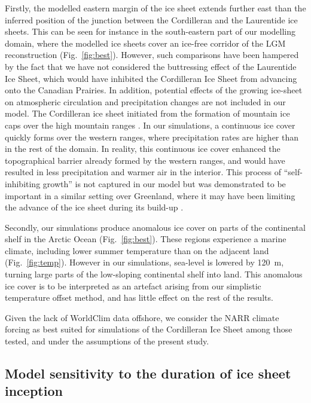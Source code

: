 Firstly, the modelled eastern margin of the ice sheet extends further east than the inferred position of the junction between the Cordilleran and the Laurentide ice sheets. This can be seen for instance in the south-eastern part of our modelling domain, where the modelled ice sheets cover an ice-free corridor of the LGM reconstruction (Fig.~\ref{fig:best}). However, such comparisons have been hampered by the fact that we have not considered the buttressing effect of the Laurentide Ice Sheet, which would have inhibited the Cordilleran Ice Sheet from advancing onto the Canadian Prairies. In addition, potential effects of the growing ice-sheet on atmospheric circulation and precipitation changes are not included in our model. The Cordilleran ice sheet initiated from the formation of mountain ice caps over the high mountain ranges \citep{clague-1989}. In our simulations, a continuous ice cover quickly forms over the western ranges, where precipitation rates are higher than in the rest of the domain. In reality, this continuous ice cover enhanced the topographical barrier already formed by the western ranges, and would have resulted in less precipitation and warmer air in the interior. This process of ``self-inhibiting growth'' is not captured in our model but was demonstrated to be important in a similar setting over Greenland, where it may have been limiting the advance of the ice sheet during its build-up \citep{langen-etal-2012}.

Secondly, our simulations produce anomalous ice cover on parts of the continental shelf in the Arctic Ocean (Fig.~\ref{fig:best}). These regions experience a marine climate, including lower summer temperature than on the adjacent land (Fig.~\ref{fig:temp}). However in our simulations, sea-level is lowered by 120~m, turning large parts of the low-sloping continental shelf into land. This anomalous ice cover is to be interpreted as an artefact arising from our simplistic temperature offset method, and has little effect on the rest of the results.

Given the lack of WorldClim data offshore, we consider the NARR climate forcing as best suited for simulations of the Cordilleran Ice Sheet among those tested, and under the assumptions of the present study.

\subsection{Model sensitivity to the duration of ice sheet inception}

